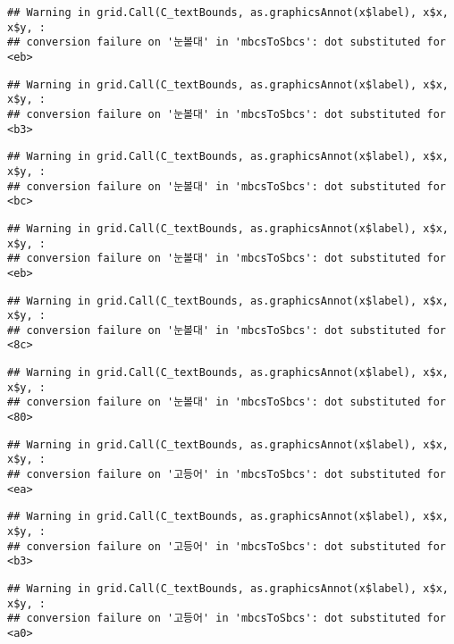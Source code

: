 \documentclass[
]{article}
\begin{document}
\begin{verbatim}
## Warning in grid.Call(C_textBounds, as.graphicsAnnot(x$label), x$x, x$y, :
## conversion failure on '눈볼대' in 'mbcsToSbcs': dot substituted for <eb>
\end{verbatim}

\begin{verbatim}
## Warning in grid.Call(C_textBounds, as.graphicsAnnot(x$label), x$x, x$y, :
## conversion failure on '눈볼대' in 'mbcsToSbcs': dot substituted for <b3>
\end{verbatim}

\begin{verbatim}
## Warning in grid.Call(C_textBounds, as.graphicsAnnot(x$label), x$x, x$y, :
## conversion failure on '눈볼대' in 'mbcsToSbcs': dot substituted for <bc>
\end{verbatim}

\begin{verbatim}
## Warning in grid.Call(C_textBounds, as.graphicsAnnot(x$label), x$x, x$y, :
## conversion failure on '눈볼대' in 'mbcsToSbcs': dot substituted for <eb>
\end{verbatim}

\begin{verbatim}
## Warning in grid.Call(C_textBounds, as.graphicsAnnot(x$label), x$x, x$y, :
## conversion failure on '눈볼대' in 'mbcsToSbcs': dot substituted for <8c>
\end{verbatim}

\begin{verbatim}
## Warning in grid.Call(C_textBounds, as.graphicsAnnot(x$label), x$x, x$y, :
## conversion failure on '눈볼대' in 'mbcsToSbcs': dot substituted for <80>
\end{verbatim}

\begin{verbatim}
## Warning in grid.Call(C_textBounds, as.graphicsAnnot(x$label), x$x, x$y, :
## conversion failure on '고등어' in 'mbcsToSbcs': dot substituted for <ea>
\end{verbatim}

\begin{verbatim}
## Warning in grid.Call(C_textBounds, as.graphicsAnnot(x$label), x$x, x$y, :
## conversion failure on '고등어' in 'mbcsToSbcs': dot substituted for <b3>
\end{verbatim}

\begin{verbatim}
## Warning in grid.Call(C_textBounds, as.graphicsAnnot(x$label), x$x, x$y, :
## conversion failure on '고등어' in 'mbcsToSbcs': dot substituted for <a0>
\end{verbatim}
\end{document}
